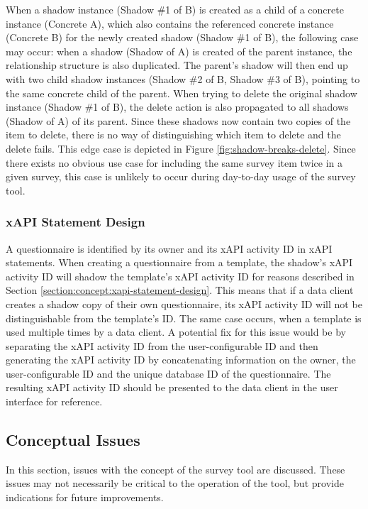     		When a shadow instance (Shadow \#1 of B) is created as a child of a concrete instance (Concrete A), which also contains the referenced
    		concrete instance (Concrete B) for the newly created shadow (Shadow \#1 of B), the following case may occur: when a shadow (Shadow of A) is created
    		of the parent instance, the relationship structure is also duplicated. The parent's shadow will
    		then end up with two child shadow instances (Shadow \#2 of B, Shadow \#3 of B), pointing to the same concrete child of the parent.
    		When trying to delete the original shadow instance (Shadow \#1 of B), the delete action is also propagated to all
    		shadows (Shadow of A) of its parent. Since these shadows now contain two copies of the
    		item to delete, there is no way of distinguishing which item to delete and the delete fails.
    		This edge case is depicted in Figure \ref{fig:shadow-breaks-delete}.
    		Since there exists no obvious use case for including the same survey item twice in a given survey,
    		this case is unlikely to occur during day-to-day usage of the survey tool.

    	\subsubsection{xAPI Statement Design}
    		A questionnaire is identified by its owner and its xAPI activity ID in xAPI statements.
    		When creating a questionnaire from a template, the shadow's xAPI activity ID will shadow
    		the template's xAPI activity ID for reasons described in Section \ref{section:concept:xapi-statement-design}.
    		This means that if a data client creates a shadow copy of their own
    		questionnaire, its xAPI activity ID will not be distinguishable from
    		the template's ID. The same case occurs, when a template is used multiple times
    		by a data client. A potential fix for this issue would be by
    		separating the xAPI activity ID from the user-configurable ID and
    		then generating the xAPI activity ID by concatenating information on
    		the owner, the user-configurable ID and the unique database ID
    		of the questionnaire. The resulting xAPI activity ID should be presented to the data client
    		in the user interface for reference.

    \subsection{Conceptual Issues}
    	In this section, issues with the concept of the survey tool are discussed.
    	These issues may not necessarily be critical to the operation of the tool,
    	but provide indications for future improvements.

